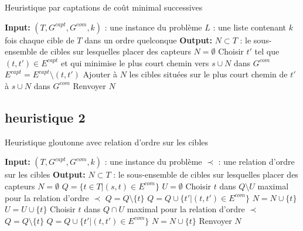 \documentclass[12pt]{article}
\begin{document}
\begin{algorithm}[H]
  \caption{Heuristique par captations de coût minimal successives}
  \label{Heuristique par captations de coût minimal successives}
  \begin{algorithmic}
      \STATE \textbf{Input:}
      \STATE $(T, G^{capt}, G^{com}, k)$ : une instance du problème
      \STATE $L$ : une liste contenant $k$ fois chaque cible de $T$ dans un ordre quelconque
      \STATE
      \STATE \textbf{Output:} $N \subset T$ : le sous-ensemble de cibles sur lesquelles placer des capteurs
      \STATE
      \STATE $N = \emptyset$
          \STATE Choisir $t'$ tel que $(t, t') \in E^{capt}$ et qui minimise le plus court chemin vers $s \cup N$ dans $G^{com}$
          \STATE $E^{capt} = E^{capt} \setminus (t, t')$
          \STATE Ajouter à $N$ les cibles situées sur le plus court chemin de $t'$ à $s \cup N$ dans $G^{com}$
      \ENDFOR
      \STATE Renvoyer $N$
  \end{algorithmic}
\end{algorithm}

\subsection{heuristique 2}

\begin{algorithm}[H]
  \caption{Heuristique gloutonne avec relation d'ordre sur les cibles}
  \label{Heuristique gloutonne avec relation d'ordre sur les cibles}
  \begin{algorithmic}
      \STATE \textbf{Input:}
      \STATE $(T, G^{capt}, G^{com},k)$ : une instance du problème
      \STATE $\prec$ : une relation d'ordre sur les cibles
      \STATE
      \STATE \textbf{Output:} $N \subset T$ : le sous-ensemble de cibles sur lesquelles placer des capteurs
      \STATE
      \STATE $N = \emptyset$
      \STATE $Q = \{t \in T | (s, t) \in E^{com}\}$
      \STATE $U = \emptyset$
              \STATE Choisir $t$ dans $Q \setminus U$ maximal pour la relation d'ordre $\prec$
                  \STATE $Q  = Q \setminus \{t\}$
                  \STATE $Q  = Q \cup \{t' | (t, t') \in E^{com}\}$
                  \STATE $N  = N \cup \{t\}$
              \ELSE
                  \STATE $U  = U \cup \{t\}$
              \ENDIF
          \ELSE 
              \STATE Choisir $t$ dans $Q \cap U$ maximal pour la relation d'ordre $\prec$
              \STATE $Q  = Q \setminus \{t\}$
              \STATE $Q  = Q \cup \{t' | (t, t') \in E^{com}\}$
              \STATE $N  = N \cup \{t\}$
          \ENDIF
      \ENDWHILE
      \STATE Renvoyer $N$
  \end{algorithmic}
\end{algorithm}
\end{document}
